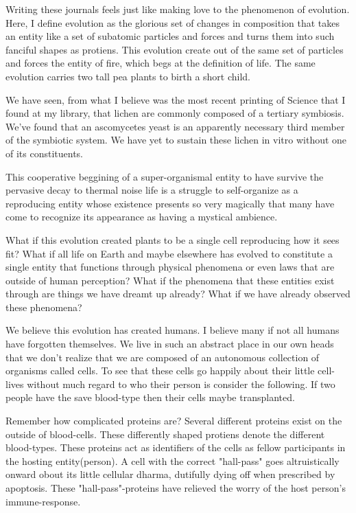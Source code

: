 Writing these journals feels just like making love to the phenomenon of evolution. Here, I define evolution as the glorious set of changes in composition that takes an entity like a set of subatomic particles and forces and turns them into such fanciful shapes as protiens. This evolution create out of the same set of particles and forces the entity of fire, which begs at the definition of life. The same evolution carries two tall pea plants to birth a short child.

We have seen, from what I believe was the most recent printing of Science that I found at my library, that lichen are commonly composed of a tertiary symbiosis. We've found that an ascomycetes yeast is an apparently necessary third member of the symbiotic system.  We have yet to sustain these lichen in vitro without one of its constituents.

This cooperative beggining of a super-organismal entity to have survive the pervasive decay to thermal noise life is a struggle to self-organize as a reproducing entity whose existence presents so very magically that many have come to recognize its appearance as having a mystical ambience.

What if this evolution created plants to be a single cell reproducing how it sees fit? What if all life on Earth and maybe elsewhere has evolved to constitute a single entity that functions through physical phenomena or even laws that are outside of human perception? What if the phenomena that these entities exist through are things we have dreamt up already? What if we have already observed these phenomena?

We believe this evolution has created humans. I believe many if not all humans have forgotten themselves. We live in such an abstract place in our own heads that we don't realize that we are composed of an autonomous collection of organisms called cells. To see that these cells go happily about their little cell-lives without much regard to who their person is consider the following. If two people have the save blood-type then their cells maybe transplanted.

Remember how complicated proteins are? Several different proteins exist on the outside of blood-cells. These differently shaped protiens denote the different  blood-types. These proteins act as identifiers of the cells as fellow participants in the hosting entity(person). A cell with the correct "hall-pass" goes altruistically onward obout its little cellular dharma, dutifully dying off when prescribed by apoptosis. These "hall-pass"-proteins have relieved the worry of the host person's immune-response.


